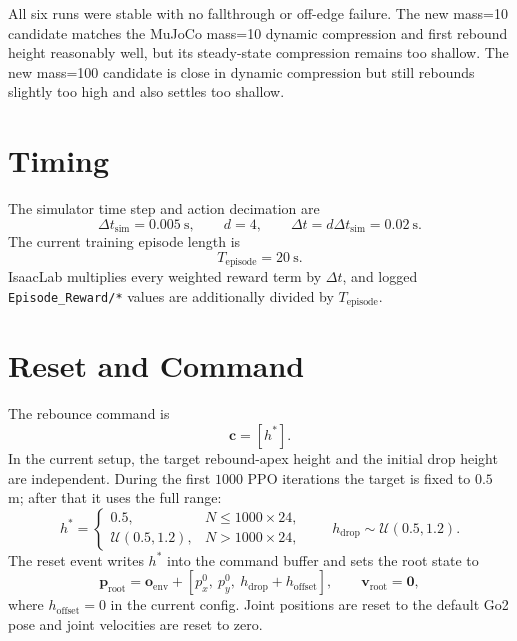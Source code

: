 \documentclass[11pt, a4paper]{article}
\begin{document}
All six runs were stable with no fallthrough or off-edge failure. The new
mass=10 candidate matches the MuJoCo mass=10 dynamic compression and first
rebound height reasonably well, but its steady-state compression remains too
shallow. The new mass=100 candidate is close in dynamic compression but still
rebounds slightly too high and also settles too shallow.

\section{Timing}

The simulator time step and action decimation are
\begin{equation}
    \Delta t_{\mathrm{sim}} = 0.005\ \mathrm{s},
    \qquad
    d = 4,
    \qquad
    \Delta t = d\Delta t_{\mathrm{sim}} = 0.02\ \mathrm{s}.
\end{equation}
The current training episode length is
\begin{equation}
    T_{\mathrm{episode}} = 20\ \mathrm{s}.
\end{equation}
IsaacLab multiplies every weighted reward term by $\Delta t$, and logged
\texttt{Episode\_Reward/*} values are additionally divided by
$T_{\mathrm{episode}}$.

\section{Reset and Command}

The rebounce command is
\begin{equation}
    \bm{c} = [h^{*}].
\end{equation}
In the current setup, the target rebound-apex height and the initial drop height
are independent. During the first $1000$ PPO iterations the target is fixed to
$0.5$ m; after that it uses the full range:
\begin{equation}
    h^{*} =
    \begin{cases}
        0.5, & N \le 1000\times24, \\
        \mathcal{U}(0.5,1.2), & N > 1000\times24,
    \end{cases}
    \qquad
    h_{\mathrm{drop}} \sim \mathcal{U}(0.5,1.2).
\end{equation}
The reset event writes $h^{*}$ into the command buffer and sets the root state
to
\begin{equation}
    \bm{p}_{\mathrm{root}} =
    \bm{o}_{\mathrm{env}} +
    \left[p_x^0,\ p_y^0,\ h_{\mathrm{drop}}+h_{\mathrm{offset}}\right],
    \qquad
    \bm{v}_{\mathrm{root}}=\bm{0},
\end{equation}
where $h_{\mathrm{offset}}=0$ in the current config. Joint positions are reset to
the default Go2 pose and joint velocities are reset to zero.
\end{document}
